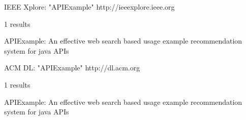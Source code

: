 IEEE Xplore: "APIExample"
http://ieeexplore.ieee.org

1 results

APIExample: An effective web search based usage example recommendation system for java APIs

ACM DL: "APIExample"
http://dl.acm.org

1 results

APIExample: An effective web search based usage example recommendation system for java APIs 
